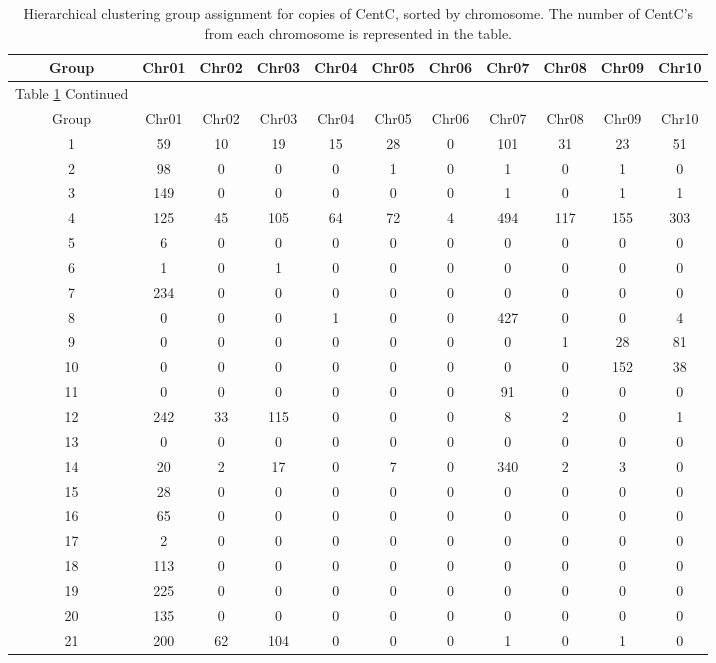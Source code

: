 \clearpage
 \begin{longtable}[c]{|c|c|c|c|c|c|c|c|c|c|c|}
 \caption{Hierarchical clustering group assignment for copies of CentC, sorted by chromosome.  The number of CentC's from each chromosome is represented in the table.\label{long}}\\ 
\hline

\hline
Group & Chr01 & Chr02 & Chr03 & Chr04 & Chr05 & Chr06 & Chr07 & Chr08 & Chr09 & Chr10\\
\hline
\endfirsthead

\multicolumn{1}{c}{Table \ref{long} Continued}\\
\hline
Group & Chr01 & Chr02 & Chr03 & Chr04 & Chr05 & Chr06 & Chr07 & Chr08 & Chr09 & Chr10\\ 
\hline
\endhead 
 
1 & 59 & 10 & 19 & 15 & 28 & 0 & 101 & 31 & 23 & 51\\
2 & 98 & 0 & 0 & 0 & 1 & 0 & 1 & 0 & 1 & 0\\
3 & 149 & 0 & 0 & 0 & 0 & 0 & 1 & 0 & 1 & 1\\
4 & 125 & 45 & 105 & 64 & 72 & 4 & 494 & 117 & 155 & 303\\
5 & 6 & 0 & 0 & 0 & 0 & 0 & 0 & 0 & 0 & 0\\
6 & 1 & 0 & 1 & 0 & 0 & 0 & 0 & 0 & 0 & 0\\
7 & 234 & 0 & 0 & 0 & 0 & 0 & 0 & 0 & 0 & 0\\
8 & 0 & 0 & 0 & 1 & 0 & 0 & 427 & 0 & 0 & 4\\
9 & 0 & 0 & 0 & 0 & 0 & 0 & 0 & 1 & 28 & 81\\
10 & 0 & 0 & 0 & 0 & 0 & 0 & 0 & 0 & 152 & 38\\
11 & 0 & 0 & 0 & 0 & 0 & 0 & 91 & 0 & 0 & 0\\
12 & 242 & 33 & 115 & 0 & 0 & 0 & 8 & 2 & 0 & 1\\
13 & 0 & 0 & 0 & 0 & 0 & 0 & 0 & 0 & 0 & 0\\
14 & 20 & 2 & 17 & 0 & 7 & 0 & 340 & 2 & 3 & 0\\
15 & 28 & 0 & 0 & 0 & 0 & 0 & 0 & 0 & 0 & 0\\
16 & 65 & 0 & 0 & 0 & 0 & 0 & 0 & 0 & 0 & 0\\
17 & 2 & 0 & 0 & 0 & 0 & 0 & 0 & 0 & 0 & 0\\
18 & 113 & 0 & 0 & 0 & 0 & 0 & 0 & 0 & 0 & 0\\
19 & 225 & 0 & 0 & 0 & 0 & 0 & 0 & 0 & 0 & 0\\
20 & 135 & 0 & 0 & 0 & 0 & 0 & 0 & 0 & 0 & 0\\
21 & 200 & 62 & 104 & 0 & 0 & 0 & 1 & 0 & 1 & 0\\

\end{longtable}
